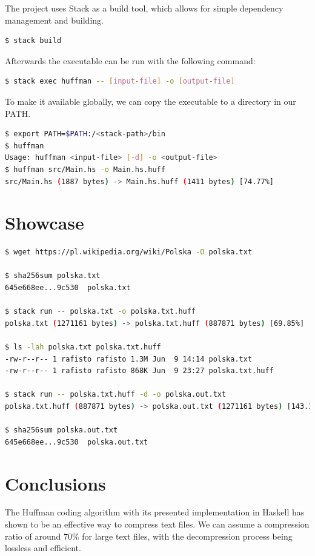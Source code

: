 \documentclass{article}
\begin{document}
The project uses Stack as a build tool, which allows for simple dependency management and building.

\begin{lstlisting}[language=bash]
$ stack build
\end{lstlisting}

Afterwards the executable can be run with the following command:

\begin{lstlisting}[language=bash]
$ stack exec huffman -- [input-file] -o [output-file]
\end{lstlisting}

To make it available globally, we can copy the executable to a directory in our PATH.

\begin{lstlisting}[language=bash]
$ export PATH=$PATH:/<stack-path>/bin
$ huffman
Usage: huffman <input-file> [-d] -o <output-file>
$ huffman src/Main.hs -o Main.hs.huff
src/Main.hs (1887 bytes) -> Main.hs.huff (1411 bytes) [74.77%]
\end{lstlisting}

\section{Showcase}

\begin{lstlisting}[language=bash]
$ wget https://pl.wikipedia.org/wiki/Polska -O polska.txt

$ sha256sum polska.txt
645e668ee...9c530  polska.txt

$ stack run -- polska.txt -o polska.txt.huff
polska.txt (1271161 bytes) -> polska.txt.huff (887871 bytes) [69.85%]

$ ls -lah polska.txt polska.txt.huff
-rw-r--r-- 1 rafisto rafisto 1.3M Jun  9 14:14 polska.txt
-rw-r--r-- 1 rafisto rafisto 868K Jun  9 23:27 polska.txt.huff

$ stack run -- polska.txt.huff -d -o polska.out.txt
polska.txt.huff (887871 bytes) -> polska.out.txt (1271161 bytes) [143.17%]

$ sha256sum polska.out.txt 
645e668ee...9c530  polska.out.txt
\end{lstlisting}

\section{Conclusions}

The Huffman coding algorithm with its presented implementation in Haskell has shown to be an effective way to compress text files.
We can assume a compression ratio of around 70\% for large text files, with the decompression process being lossless and efficient.
\end{document}
